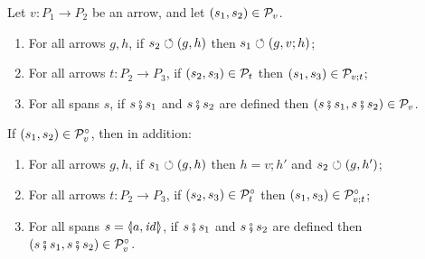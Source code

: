 \begin{proposition}
Let $v:P_1\to P_2$ be an arrow, and let $(s_1,s_2)\in \mathcal{P}_v$.
\begin{enumerate}[topsep=\smallskipamount]
\item\label{pattern-preserves} For all arrows $g,h$, if $s_2\circlearrowleft (g,h)$ then $s_1\circlearrowleft (g,v;h)$;
\item\label{pattern-transitive} For all arrows $t:P_2\to P_3$, if $(s_2,s_3)\in \mathcal{P}_t$ then  $(s_1,s_3)\in \mathcal{P}_{v;t}$;
\item\label{pattern-congruence} For all spans $s$, if $s\fatsemi s_1$ and $s \fatsemi s_2$ are defined then $(s\fatsemi s_1,s \fatsemi s_2)\in \mathcal{P}_v$.
\end{enumerate}
If $(s_1,s_2)\in \mathcal{P}^\circ_v$, then in addition:
\begin{enumerate}[resume,topsep=\smallskipamount]
\item\label{conservative-reflects} For all arrows $g,h$, if $s_1\circlearrowleft (g,h)$ then $h=v;h'$ and $s_2\circlearrowleft (g,h')$;
\item\label{conservative-transitive} For all arrows $t:P_2\to P_3$, if $(s_2,s_3)\in \mathcal{P}^\circ_t$ then $(s_1,s_3)\in \mathcal{P}^\circ_{v;t}$;
\item\label{conservative-congruence} For all spans $s=\spanof{a}{\id}$, if $s\fatsemi s_1$ and $s\fatsemi s_2$ are defined then $(s\fatsemi s_1,s\fatsemi s_2)\in \mathcal{P}^\circ_v$.
\end{enumerate}
\end{proposition}
%
